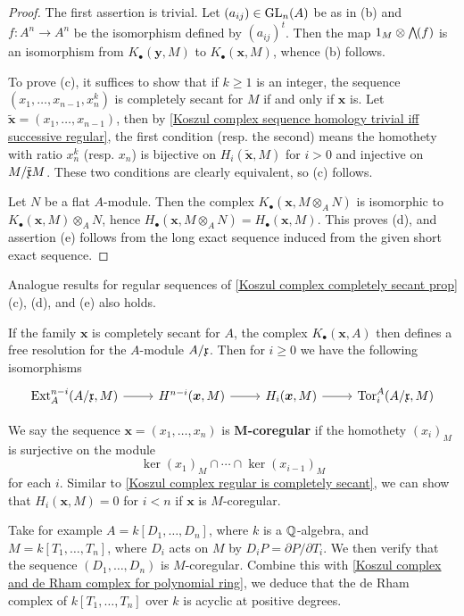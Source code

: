 \begin{proof}
The first assertion is trivial. Let $(a_{ij})\in\mathrm{GL}_n(A)$ be as in (b) and $f:A^n\to A^n$ be the isomorphism defined by $(a_{ij})^t$. Then the map $1_M\otimes\bigw(f)$ is an isomorphism from $K_\bullet(\bm{y},M)$ to $K_\bullet(\bm{x},M)$, whence (b) follows.\par
To prove (c), it suffices to show that if $k\geq 1$ is an integer, the sequence $(x_1,\dots,x_{n-1},x_n^k)$ is completely secant for $M$ if and only if $\bm{x}$ is. Let $\tilde{\bm{x}}=(x_1,\dots,x_{n-1})$, then by \cref{Koszul complex sequence homology trivial iff successive regular}, the first condition (resp. the second) means the homothety with ratio $x_n^k$ (resp. $x_n$) is bijective on $H_i(\tilde{\bm{x}},M)$ for $i>0$ and injective on $M/\tilde{\mathfrak{x}}M$. These two conditions are clearly equivalent, so (c) follows.\par
Let $N$ be a flat $A$-module. Then the complex $K_\bullet(\bm{x},M\otimes_AN)$ is isomorphic to $K_\bullet(\bm{x},M)\otimes_AN$, hence $H_\bullet(\bm{x},M\otimes_AN)=H_\bullet(\bm{x},M)$. This proves (d), and assertion (e) follows from the long exact sequence induced from the given short exact sequence.
\end{proof}
\begin{remark}
Analogue results for regular sequences of \cref{Koszul complex completely secant prop}(c), (d), and (e) also holds.
\end{remark}
\begin{remark}
If the family $\bm{x}$ is completely secant for $A$, the complex $K_\bullet(\bm{x},A)$ then defines a free resolution for the $A$-module $A/\mathfrak{x}$. Then for $i\geq 0$ we have the following isomorphisms 
\begin{equation}\label{Koszul sequence completely secant for A EXt and Tor iso}
\begin{tikzcd}
\Ext_A^{n-i}(A/\x,M)\ar[r]&H^{n-i}(\bm{x},M)\ar[r]&H_i(\bm{x},M)\ar[r]&\Tor^A_i(A/\x,M)
\end{tikzcd}
\end{equation}
\end{remark}
\begin{example}
We say the sequence $\bm{x}=(x_1,\dots,x_n)$ is \textbf{$\bm{M}$-coregular} if the homothety $(x_i)_M$ is surjective on the module
\[\ker(x_1)_M\cap\cdots\cap\ker(x_{i-1})_M\]
for each $i$. Similar to \cref{Koszul complex regular is completely secant}, we can show that $H_i(\bm{x},M)=0$ for $i<n$ if $\bm{x}$ is $M$-coregular.\par
Take for example $A=k[D_1,\dots,D_n]$, where $k$ is a $\mathbb{Q}$-algebra, and $M=k[T_1,\dots,T_n]$, where $D_i$ acts on $M$ by $D_iP=\partial P/\partial T_i$. We then verify that the sequence $(D_1,\dots,D_n)$ is $M$-coregular. Combine this with \cref{Koszul complex and de Rham complex for polynomial ring}, we deduce that the de Rham complex of $k[T_1,\dots,T_n]$ over $k$ is acyclic at positive degrees.
\end{example}

